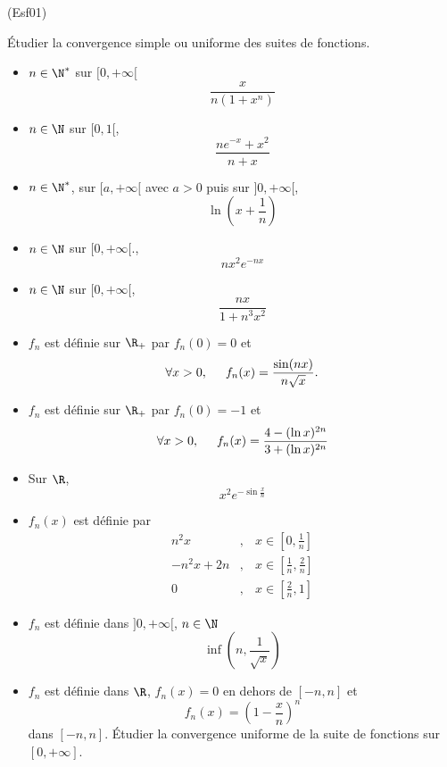 \begin{tiny}(Esf01)\end{tiny} {\'E}tudier la convergence simple ou uniforme des suites de fonctions.
\begin{itemize}
  \item $n\in\N^*$ sur
      $[0,+\infty[$ $$\frac{x}{n(1+x^n)}$$
   \item $n\in\N$ sur $[0,1[$, $$\frac{n e^{-x}+x^2}{n+x}$$
   \item $n\in\N^*$, sur $[a,+\infty[$ avec $a>0$ puis sur $]0,+\infty[$,
      $$\ln(x+\frac{1}{n})$$
   \item $n\in\N$ sur $[0,+\infty[$., $$nx^2e^{-nx}$$
   \item $n\in\N$ sur $[0,+\infty[$,
      $$\frac{nx}{1+n^3x^2}$$
   \item $f_n$ est d{\'e}finie sur $\R_+$ par $f_n(0)=0$ et
\begin{displaymath}
\forall x> 0,\hspace{0.5cm}    f_n(x)= \frac{\sin(nx)}{n\sqrt x}. 
\end{displaymath}
      
   \item $f_n$ est d{\'e}finie sur $\R_+$ par $f_n(0)=-1$ et
\begin{displaymath}
\forall x> 0,\hspace{0.5cm}    f_n(x)=\frac{4-(\ln x)^{2n}}{3+(\ln x)^{2n}}
\end{displaymath}

   \item Sur $\R$, $$x^2e^{-\sin \frac{x}{n}}$$
   \item $f_n(x)$ est d{\'e}finie par
      \begin{eqnarray*}
      n^2x &,&\,x \in [0,\frac{1}{n}]\\
      -n^2x+2n &,&\, x \in [\frac{1}{n},\frac{2}{n}]\\
      0 &,& \, x\in [\frac{2}{n},1]
      \end{eqnarray*}
   \item $f_n$ est d{\'e}finie dans $]0,+\infty[$, $n\in \N$
      \[\inf(n,\frac{1}{\sqrt{x}})\]
   \item $f_n$ est d{\'e}finie dans $\R$, $f_n(x)=0$ en dehors de $[-n,n]$ et
      \[f_n(x)=(1-\frac{x}{n})^n\]
      dans $[-n,n]$. {\'E}tudier la convergence uniforme de la suite de fonctions sur $[0,+\infty]$.
\end{itemize}
